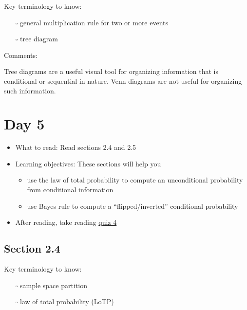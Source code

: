 \documentclass[
  letterpaper,
]{scrbook}
\providecommand{\tightlist}{%
  \setlength{\itemsep}{0pt}\setlength{\parskip}{0pt}}\usepackage{longtable,booktabs,array}
\begin{document}
Key terminology to know:

\begin{itemize}
\tightlist
\item[$\square$]
  general multiplication rule for two or more events
\item[$\square$]
  tree diagram
\end{itemize}

Comments:

Tree diagrams are a useful visual tool for organizing information that
is conditional or sequential in nature. Venn diagrams are not useful for
organizing such information.

\section*{Day 5}\label{day-5}


\begin{itemize}
\item
  What to read: Read sections 2.4 and 2.5
\item
  Learning objectives: These sections will help you

  \begin{itemize}
  \tightlist
  \item
    use the law of total probability to compute an unconditional
    probability from conditional information
  \item
    use Bayes rule to compute a ``flipped/inverted'' conditional
    probability
  \end{itemize}
\item
  After reading, take reading
  \href{https://forms.gle/qqLNKnNCf21jkaL96}{quiz 4}
\end{itemize}

\subsection*{Section 2.4}\label{section-2.4}

Key terminology to know:

\begin{itemize}
\tightlist
\item[$\square$]
  sample space partition
\item[$\square$]
  law of total probability (LoTP)
\end{itemize}
\end{document}
